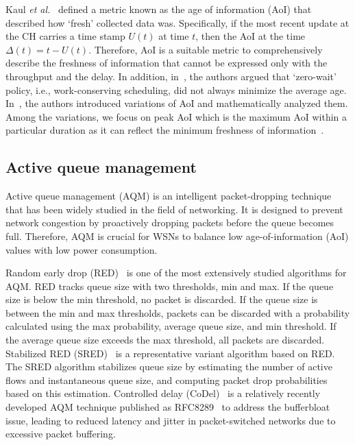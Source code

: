 \documentclass[journal]{IEEEtran}
\begin{document}
Kaul \textit{et al.}~\cite{Kaul2012} defined a metric known as the age of information (AoI) that described how `fresh' collected data was. Specifically, if the most recent update at the CH carries a time stamp $U(t)$ at time $t$, then the AoI at the time $\Delta(t) = t - U(t)$. Therefore, AoI is a suitable metric to comprehensively describe the freshness of information that cannot be expressed only with the throughput and the delay. In addition, in~\cite{Sun2016}, the authors argued that `zero-wait' policy, i.e., work-conserving scheduling, did not always minimize the average age. In~\cite{Yates2021}, the authors introduced variations of AoI and mathematically analyzed them. Among the variations, we focus on peak AoI which is the maximum AoI within a particular duration as it can reflect the minimum freshness of information~\cite{diao2022}.

\subsection{Active queue management}
Active queue management (AQM) is an intelligent packet-dropping technique that has been widely studied in the field of networking. It is designed to prevent network congestion by proactively dropping packets before the queue becomes full. Therefore, AQM is crucial for WSNs to balance low age-of-information (AoI) values with low power consumption. 

Random early drop (RED)~\cite{floyd1993random} is one of the most extensively studied algorithms for AQM. RED tracks queue size with two thresholds, min and max. If the queue size is below the min threshold, no packet is discarded. If the queue size is between the min and max thresholds, packets can be discarded with a probability calculated using the max probability, average queue size, and min threshold. If the average queue size exceeds the max threshold, all packets are discarded. Stabilized RED (SRED)~\cite{Ott1999} is a representative variant algorithm based on RED. The SRED algorithm stabilizes queue size by estimating the number of active flows and instantaneous queue size, and computing packet drop probabilities based on this estimation. Controlled delay (CoDel)~\cite{Nichols2012} is a relatively recently developed AQM technique published as RFC8289~\cite{rfc8289} to address the bufferbloat issue, leading to reduced latency and jitter in packet-switched networks due to excessive packet buffering.
\end{document}
